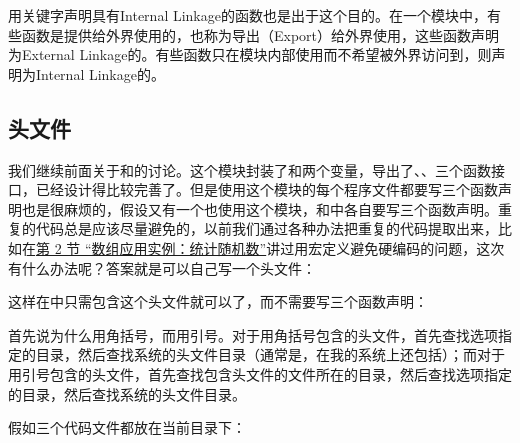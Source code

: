 用关键字声明具有Internal Linkage的函数也是出于这个目的。在一个模块中，有些函数是提供给外界使用的，也称为导出（Export）给外界使用，这些函数声明为External Linkage的。有些函数只在模块内部使用而不希望被外界访问到，则声明为Internal Linkage的。


\subsection{头文件}
%


我们继续前面关于和的讨论。这个模块封装了和两个变量，导出了、、三个函数接口，已经设计得比较完善了。但是使用这个模块的每个程序文件都要写三个函数声明也是很麻烦的，假设又有一个也使用这个模块，和中各自要写三个函数声明。重复的代码总是应该尽量避免的，以前我们通过各种办法把重复的代码提取出来，比如在\hyperlink{db.ch08s02.id2733695}{第 2 节 “数组应用实例：统计随机数”}讲过用宏定义避免硬编码的问题，这次有什么办法呢？答案就是可以自己写一个头文件：




这样在中只需包含这个头文件就可以了，而不需要写三个函数声明：




首先说为什么用角括号，而用引号。对于用角括号包含的头文件，首先查找选项指定的目录，然后查找系统的头文件目录（通常是，在我的系统上还包括）；而对于用引号包含的头文件，首先查找包含头文件的文件所在的目录，然后查找选项指定的目录，然后查找系统的头文件目录。



假如三个代码文件都放在当前目录下：




